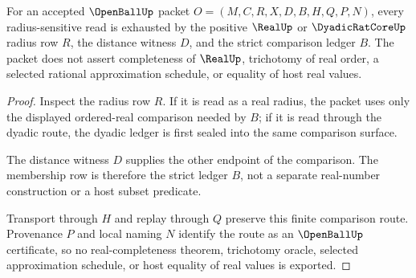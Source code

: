 \begin{theorem}
\label{thm:open-ball-real-radius-boundary}
For an accepted $\OpenBallUp$ packet $O=(M,C,R,X,D,B,H,Q,P,N)$, every radius-sensitive read is exhausted by the positive $\RealUp$ or $\DyadicRatCoreUp$ radius row $R$, the distance witness $D$, and the strict comparison ledger $B$. The packet does not assert completeness of $\RealUp$, trichotomy of real order, a selected rational approximation schedule, or equality of host real values.
\end{theorem}
\begin{proof}
Inspect the radius row $R$. If it is read as a real radius, the packet uses only the displayed ordered-real comparison needed by $B$; if it is read through the dyadic route, the dyadic ledger is first sealed into the same comparison surface.

The distance witness $D$ supplies the other endpoint of the comparison. The membership row is therefore the strict ledger $B$, not a separate real-number construction or a host subset predicate.

Transport through $H$ and replay through $Q$ preserve this finite comparison route. Provenance $P$ and local naming $N$ identify the route as an $\OpenBallUp$ certificate, so no real-completeness theorem, trichotomy oracle, selected approximation schedule, or host equality of real values is exported.
\end{proof}


\begin{closurestatus}{\OpenBallUp}
  \theoryclosure{\seedClosure}
  \formalstatus{\unformalizedV}
\end{closurestatus}
